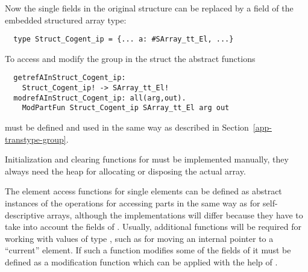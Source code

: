 Now the single fields in the original structure can be replaced by a field of the embedded structured array type:
\begin{verbatim}
  type Struct_Cogent_ip = {... a: #SArray_tt_El, ...}
\end{verbatim}

To access and modify the group in the struct the abstract functions
\begin{verbatim}
  getrefAInStruct_Cogent_ip: 
    Struct_Cogent_ip! -> SArray_tt_El!
  modrefAInStruct_Cogent_ip: all(arg,out). 
    ModPartFun Struct_Cogent_ip SArray_tt_El arg out 
\end{verbatim}
must be defined and used in the same way as described in Section~\ref{app-transtype-group}.

Initialization and clearing functions for  must be implemented manually, they always need the
heap for allocating or disposing the actual array. 

The element access functions for single elements can be defined as abstract instances of the operations for accessing parts 
in the same way as for self-descriptive arrays, although the implementations will differ because they have to 
take into account the fields of . Usually, additional functions will be required for working
with values of type , such as for moving an internal pointer to a ``current'' element.
If such a function modifies some of the fields of  it must be defined as a modification function
which can be applied with the help of .
